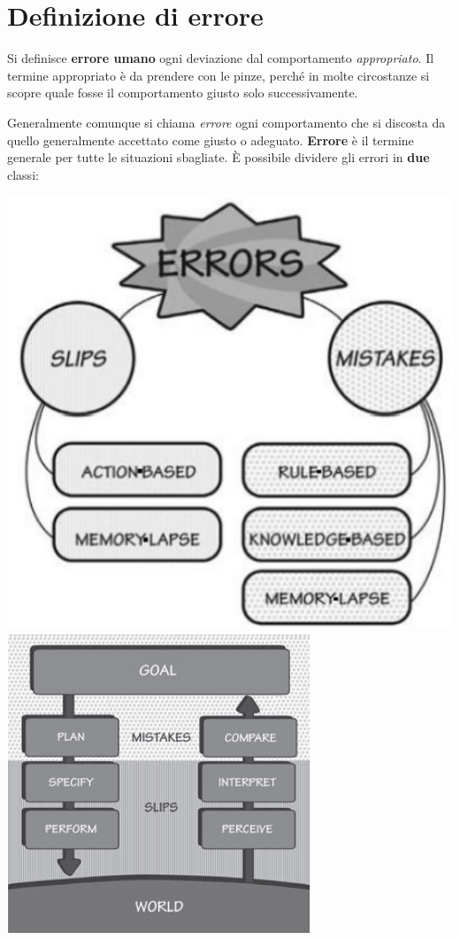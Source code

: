 \section{Definizione di errore}
Si definisce \textbf{errore umano} ogni deviazione dal comportamento \textit{appropriato}. Il termine appropriato è da prendere con le pinze, perché in molte circostanze si scopre quale fosse il comportamento giusto solo successivamente.

Generalmente comunque si chiama \textit{errore} ogni comportamento che si discosta da quello generalmente accettato come giusto o adeguato. \textbf{Errore} è il termine generale per tutte le situazioni sbagliate. È possibile dividere gli errori in \textbf{due} classi:

\begin{multicols}{2}
	\centering
	\includegraphics[scale=0.25]{immagini/Errors.png}
	\includegraphics[scale=0.4]{immagini/Errors1.png}
\end{multicols}

